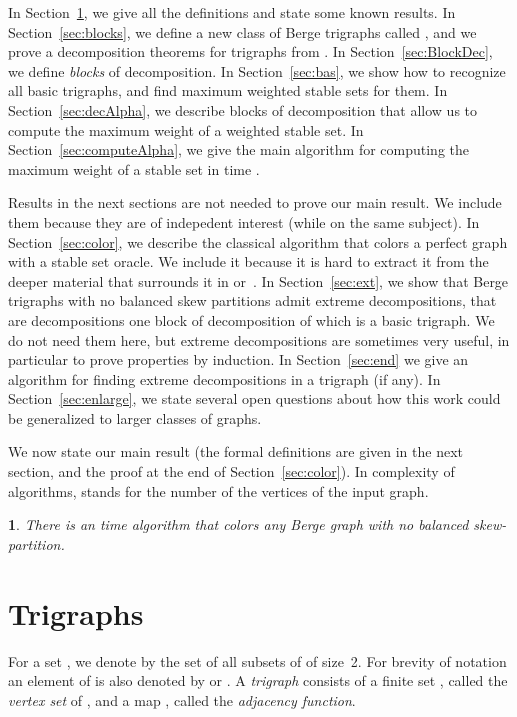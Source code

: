 \documentclass[11 pt] {article}
\newtheorem{theorem}{}[section]
\begin{document}
In Section~\ref{sec:def}, we give all the definitions and state some
known results. In Section~\ref{sec:blocks}, we define a new class of
Berge trigraphs called , and we prove a decomposition theorems
for trigraphs from .  In Section~\ref{sec:BlockDec}, we define
\emph{blocks} of decomposition. In Section~\ref{sec:bas}, we
show how to recognize all basic trigraphs, and find maximum weighted
stable sets for them. In
Section~\ref{sec:decAlpha}, we describe blocks of decomposition that
allow us to compute the maximum weight of a weighted stable set.  In
Section~\ref{sec:computeAlpha}, we give the main algorithm for
computing the maximum weight of a stable set in time .  

Results in the next sections are not needed to prove our main result.
We include them because they are of indepedent interest (while on the
same subject).  In Section~\ref{sec:color}, we describe the classical
algorithm that colors a perfect graph with a stable set oracle.  We
include it because it is hard to extract it from the deeper material that
surrounds it in \cite{gls:color} or~\cite{KrSe:colorP}.  In
Section~\ref{sec:ext}, we show that Berge trigraphs with no
balanced skew partitions admit extreme decompositions, that are
decompositions one block of decomposition of which is a basic
trigraph.  We do not need them here, but extreme decompositions are
sometimes very useful, in particular to prove properties by induction.
In Section~\ref{sec:end} we give an algorithm for finding extreme decompositions in a
trigraph (if any).  In Section~\ref{sec:enlarge}, we state several
open questions about how this work could be generalized to larger
classes of graphs.

We now state our main result (the formal definitions are given in the
next section, and the proof at the end of Section~\ref{sec:color}). In
complexity of algorithms,  stands for the number of the vertices of
the input graph.

\begin{theorem}
  \label{th:colorM}
  There is an  time algorithm that colors any Berge graph with
  no balanced skew-partition.
\end{theorem}




\section{Trigraphs}
\label{sec:def}

For a set , we denote by  the set of all subsets of
 of size~2. For brevity of notation an element  of  is also denoted by  or . A {\em trigraph} 
consists of a finite set , called the {\em vertex set} of ,
and a map ,
called the {\em adjacency function}.
\end{document}
